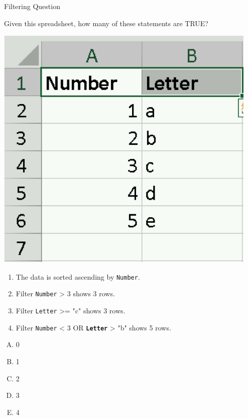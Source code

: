\documentclass[xcolor=svgnames]{beamer}
\begin{document}
\begin{frame}{Filtering Question}

  \begin{example}
 Given this spreadsheet, how many of these statements are TRUE?
 \vspace{-7mm}
 \begin{center}
    \includegraphics[height=.4\textheight]{FilteringQ}
 \end{center}
 \vspace{-1em}
\begin{enumerate}
\item The data is sorted ascending by {\tt Number}.
\item Filter {\tt Number} > 3 shows 3 rows.
\item Filter {\tt Letter} >= "c" shows 3 rows.
\item Filter {\tt Number} < 3 OR \textbf{\tt Letter} > "b" shows 5 rows.
\end{enumerate}
\vspace{-5mm}
\begin{multicols}{5}
\begin{enumerate}[A)]
\item 0 
\item 1
\item 2
\item 3
\item 4
\end{enumerate}
\end{multicols}
  \end{example} 
\end{frame}
\end{document}
